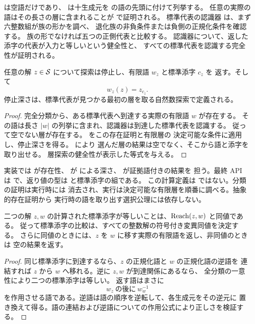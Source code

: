  は空語だけであり、 は十生成元を
 の語の先頭に付けて列挙する。
任意の実際の語はその長さの層に含まれることが
 で証明される。
標準代表の認識器  は、まず六整数組が族の形かを調べ、
退化族の非負条件または負側の正規化条件を確認する。
族の形でなければ五つの正側代表と比較する。
認識器について、返した添字の代表が入力と等しいという健全性と、
すべての標準代表を認識する完全性が証明される。

\begin{theorem}[探索の停止と実際の変異語]
\label{bp:alg-termination}
\leanok
{}
任意の解 $z\in\mathcal S$ について探索は停止し、有限語 $w_z$ と標準添字 $c_z$ を
返す。そして
\[
 w_z(z)=z_{c_z}.
\]
停止深さは、標準代表が見つかる最初の層を取る自然数探索で定義される。
\end{theorem}
\begin{proof}
\leanok
完全分類から、ある標準代表へ到達する実際の有限語 $w$ が存在する。
その語は長さ $|w|$ の列挙に含まれ、認識器は到達した標準代表を認識する。
従って空でない層が存在する。 をこの存在証明と有限層の
決定可能な条件に適用し、停止深さを得る。 により
選んだ層の結果は空でなく、そこから語と添字を取り出せる。
層探索の健全性が表示した等式を与える。
\end{proof}

実装では  が存在性、 が
 による深さ、 が証拠語付きの結果を
担う。最終 API は  で、返り値の型は
 と標準添字の組である。
この計算定義は  ではない。分類の証明は実行時には
消去され、実行は決定可能な有限層を順番に調べる。抽象的存在証明から
実行時の語を取り出す選択公理には依存しない。

\begin{theorem}[変異同値判定と到達語]
\label{bp:alg-mutation}
\leanok
{}
二つの解 $z,w$ の計算された標準添字が等しいことは、$\operatorname{Reach}(z,w)$ と同値である。
従って標準添字の比較は、すべての整数解の符号付き変異同値を決定する。
さらに同値のときには、$z$ を $w$ に移す実際の有限語を返し、非同値のときは
空の結果を返す。
\end{theorem}
\begin{proof}
\leanok
同じ標準添字に到達するなら、$z$ の正規化語と $w$ の正規化語の逆語を
連結すれば $z$ から $w$ へ移れる。逆に $z,w$ が到達関係にあるなら、
全分類の一意性により二つの標準添字は等しい。
返す語はまさに
\[
 w_z\ \text{の後に}\ w_w^{-1}
\]
を作用させる語である。逆語は語の順序を逆転して、各生成元をその逆元に
置き換えて得る。語の連結および逆語についての作用公式により正しさを検証する。
\end{proof}

